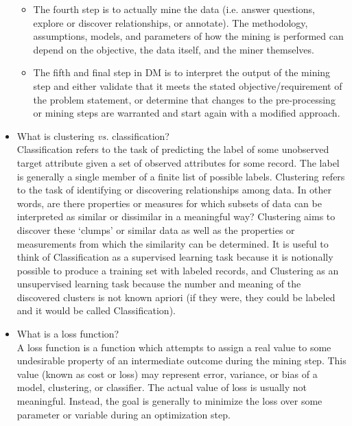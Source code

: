 \documentclass[fleqn,10pt]{SelfArx} %
\begin{document}
\begin{itemize}[noitemsep]
\begin{itemize}
	\item The fourth step is to actually mine the data (i.e. answer questions, explore or discover relationships, or annotate).  The methodology, assumptions, models, and parameters of how the mining is performed can depend on the objective, the data itself, and the miner themselves.
	
	\item The fifth and final step in DM is to interpret the output of the mining step and either validate that it meets the stated objective/requirement of the problem statement, or determine that changes to the pre-processing or mining steps are warranted and start again with a modified approach.

\end{itemize}

\item What is clustering \textit{vs.} classification?\\
  Classification refers to the task of predicting the label of some unobserved target attribute given a set of observed attributes for some record.  The label is generally a single member of a finite list of possible labels.  Clustering refers to the task of identifying or discovering relationships among data.  In other words, are there properties or measures for which subsets of data can be interpreted as similar or dissimilar in a meaningful way?  Clustering aims to discover these `clumps' or similar data as well as the properties or measurements from which the similarity can be determined.  It is useful to think of Classification as a supervised learning task because it is notionally possible to produce a training set with labeled records, and Clustering as an unsupervised learning task because the number and meaning of the discovered clusters is not known apriori (if they were, they could be labeled and it would be called Classification).

\item What is a loss function?\\
 A loss function is a function which attempts to assign a real value to some undesirable property of an intermediate outcome during the mining step.  This value (known as cost or loss) may represent error, variance, or bias of a model, clustering, or classifier.  The actual value of loss is usually not meaningful.  Instead, the goal is generally to minimize the loss over some parameter or variable during an optimization step.

\end{itemize}
\end{document}
